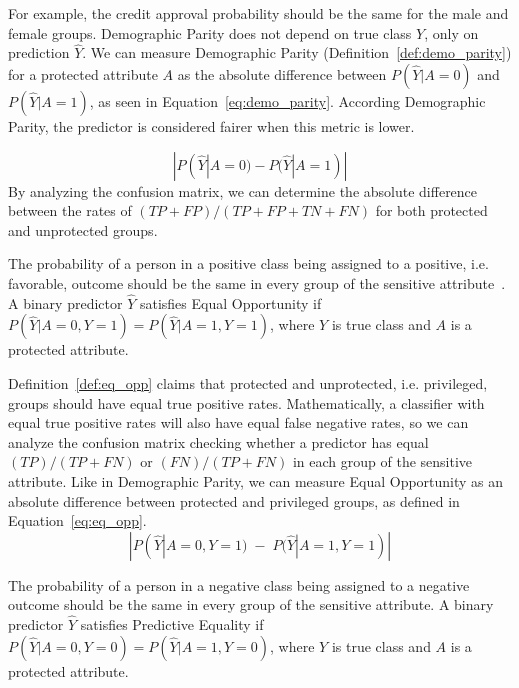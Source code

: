 For example, the credit approval probability should be the same for the male and female groups. Demographic Parity does not depend on true class $Y$, only on prediction $\hat{Y}$. We can measure Demographic Parity (Definition~\ref{def:demo_parity}) for a protected attribute $A$ as the absolute difference between $P(\hat{Y}|A=0)$ and $P(\hat{Y}|A=1)$, as seen in Equation~\ref{eq:demo_parity}. According Demographic Parity, the predictor is considered fairer when this metric is lower.

\begin{equation}\label{eq:demo_parity}
    |P(\hat{Y}|A=0)-P(\hat{Y}|A=1)|
\end{equation}
By analyzing the confusion matrix, we can determine the absolute difference between the rates of $(TP + FP)/(TP + FP + TN + FN)$ for both protected and unprotected groups.

\begin{definition}\label{def:eq_opp}
The probability of a person in a positive class being assigned to a positive, i.e. favorable, outcome should be the same in every group of the sensitive attribute~\citep{Hardt2016}. A binary predictor $\hat{Y}$ satisfies Equal Opportunity if $P(\hat{Y}|A=0,Y=1) = P(\hat{Y}|A=1,Y=1)$, where $Y$ is true class and $A$ is a protected attribute.
\end{definition}

Definition~\ref{def:eq_opp} claims that protected and unprotected, i.e. privileged, groups should have equal true positive rates. Mathematically, a classifier with equal true positive rates will also have equal false negative rates, so we can analyze the confusion matrix checking whether a predictor has equal $(TP)/(TP + FN)$ or $(FN)/(TP + FN)$ in each group of the sensitive attribute. Like in Demographic Parity, we can measure Equal Opportunity as an absolute difference between protected and privileged groups, as defined in Equation~\ref{eq:eq_opp}.
\begin{equation}\label{eq:eq_opp}
    |P(\hat{Y}|A=0,Y=1)\; - \; P(\hat{Y}|A=1,Y=1)|
\end{equation}

\begin{definition}\label{def:pred_eq}
The probability of a person in a negative class being assigned to a negative outcome should be the same in every group of the sensitive attribute. A binary predictor $\hat{Y}$ satisfies Predictive Equality if $P(\hat{Y}|A=0,Y=0) = P(\hat{Y}|A=1,Y=0)$, where $Y$ is true class and $A$ is a protected attribute.
\end{definition}

